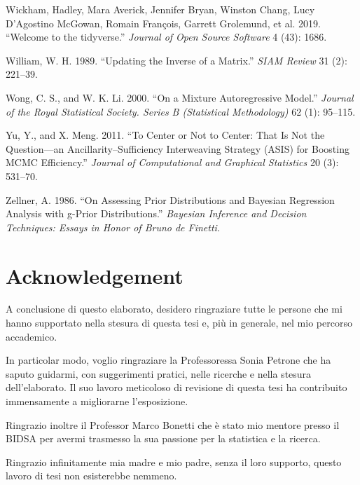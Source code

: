 \documentclass[
  12pt,
]{book}
\newlength{\cslhangindent}
\newlength{\cslentryspacingunit} %
\newenvironment{CSLReferences}[2] %
 {%
  \setlength{\parindent}{0pt}
  \ifodd #1
  \let\oldpar\par
  \def\par{\hangindent=\cslhangindent\oldpar}
  \fi
  \setlength{\parskip}{#2\cslentryspacingunit}
 }%
 {}
\theoremstyle{break}
\theoremstyle{nonumberplain}
\begin{document}
\begin{CSLReferences}{1}{0}
\leavevmode{}%
Wickham, Hadley, Mara Averick, Jennifer Bryan, Winston Chang, Lucy
D'Agostino McGowan, Romain François, Garrett Grolemund, et al. 2019.
{``Welcome to the {tidyverse}.''} \emph{Journal of Open Source Software}
4 (43): 1686.

\leavevmode{}%
William, W. H. 1989. {``Updating the Inverse of a Matrix.''} \emph{SIAM
Review} 31 (2): 221--39.

\leavevmode{}%
Wong, C. S., and W. K. Li. 2000. {``On a Mixture Autoregressive
Model.''} \emph{Journal of the Royal Statistical Society. Series B
(Statistical Methodology)} 62 (1): 95--115.

\leavevmode{}%
Yu, Y., and X. Meng. 2011. {``To Center or Not to Center: That Is Not
the Question---an Ancillarity--Sufficiency Interweaving Strategy (ASIS)
for Boosting MCMC Efficiency.''} \emph{Journal of Computational and
Graphical Statistics} 20 (3): 531--70.

\leavevmode{}%
Zellner, A. 1986. {``On Assessing Prior Distributions and Bayesian
Regression Analysis with g-Prior Distributions.''} \emph{Bayesian
Inference and Decision Techniques: Essays in Honor of Bruno de Finetti}.

\end{CSLReferences}

\chapter{Acknowledgement}

A conclusione di questo elaborato, desidero ringraziare tutte le persone
che mi hanno supportato nella stesura di questa tesi e, più in generale,
nel mio percorso accademico.

In particolar modo, voglio ringraziare la Professoressa Sonia Petrone
che ha saputo guidarmi, con suggerimenti pratici, nelle ricerche e nella
stesura dell'elaborato. Il suo lavoro meticoloso di revisione di questa
tesi ha contribuito immensamente a migliorarne l'esposizione.

Ringrazio inoltre il Professor Marco Bonetti che è stato mio mentore
presso il BIDSA per avermi trasmesso la sua passione per la statistica e
la ricerca.

Ringrazio infinitamente mia madre e mio padre, senza il loro supporto,
questo lavoro di tesi non esisterebbe nemmeno.
\end{document}
